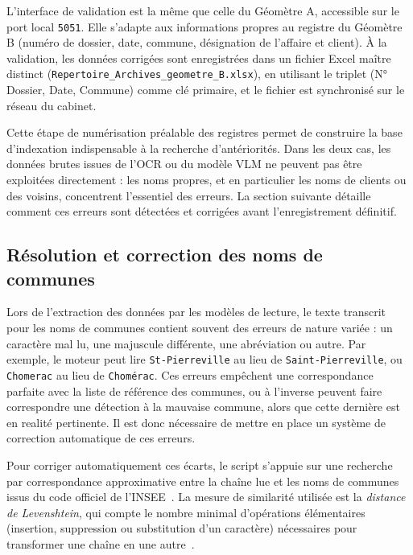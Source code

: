 L'interface de validation est la même que celle du Géomètre A, accessible sur le port local \texttt{5051}. Elle s'adapte aux informations propres au registre du Géomètre B (numéro de dossier, date, commune, désignation de l'affaire et client). À la validation, les données corrigées sont enregistrées dans un fichier Excel maître distinct (\texttt{Repertoire\_Archives\_}\linebreak[0]\texttt{geometre\_B.xlsx}), en utilisant le triplet (N° Dossier, Date, Commune) comme clé primaire, et le fichier est synchronisé sur le réseau du cabinet.

Cette étape de numérisation préalable des registres permet de construire la base d'indexation indispensable à la recherche d'antériorités. Dans les deux cas, les données brutes issues de l'OCR ou du modèle VLM ne peuvent pas être exploitées directement : les noms propres, et en particulier les noms de clients ou des voisins, concentrent l'essentiel des erreurs. La section suivante détaille comment ces erreurs sont détectées et corrigées avant l'enregistrement définitif.


\subsection{Résolution et correction des noms de communes}
\label{subsec:appariement_communes}

Lors de l'extraction des données par les modèles de lecture, le texte transcrit pour les noms de communes contient souvent des erreurs de nature variée : un caractère mal lu, une majuscule différente, une abréviation ou autre. Par exemple, le moteur peut lire \texttt{St-Pierreville} au lieu de \texttt{Saint-Pierreville}, ou \texttt{Chomerac} au lieu de \texttt{Chomérac}. Ces erreurs empêchent une correspondance parfaite avec la liste de référence des communes, ou à l'inverse peuvent faire correspondre une détection à la mauvaise commune, alors que cette dernière est en realité pertinente. Il est donc nécessaire de mettre en place un système de correction automatique de ces erreurs.

Pour corriger automatiquement ces écarts, le script s'appuie sur une recherche par correspondance approximative entre la chaîne lue et les noms de communes issus du code officiel de l'INSEE~\citep{insee_cog}. La mesure de similarité utilisée est la \textit{distance de Levenshtein}, qui compte le nombre minimal d'opérations élémentaires (insertion, suppression ou substitution d'un caractère) nécessaires pour transformer une chaîne en une autre~\citep{levenshtein_binary_1966}.


